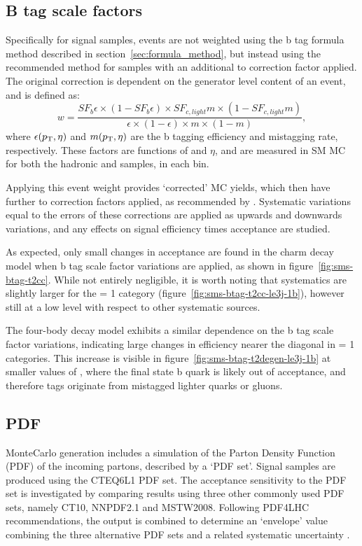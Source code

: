 \subsection{B tag scale factors}
Specifically for \FASTSIM signal samples, events are not weighted using the 
b tag formula method described in section~\ref{sec:formula_method}, but instead
using the 
recommended method for \FULLSIM samples with an additional \FULLSIM to \FASTSIM 
correction factor applied. The original correction is dependent on the generator
level content of an event, and is defined as:
% 
\begin{equation}
w = \frac{SF_b \epsilon \times (1-SF_b \epsilon) \times SF_{c,light} m \times (1
-SF_{c,light} m)}{\epsilon \times (1-\epsilon) \times m \times (1-m)} ,
\label{eq:btag_fullsim_weight}
\end{equation}
% 
where $\epsilon({p_{\text T}}, \eta)$ and $m({p_{\text T}}, \eta)$ are the b tagging efficiency and 
mistagging rate, respectively. These factors are functions of \Pt and $\eta$, and
are measured in SM MC for both the hadronic and \mj samples, in each \HT bin.

Applying this event weight provides `corrected' MC yields, which then 
have further \FASTSIM to \FULLSIM correction factors applied, as recommended by
\cite{btagpogtwiki}.
Systematic variations equal to the errors of these corrections are applied as 
upwards and downwards variations, and any effects on signal efficiency times 
acceptance are studied.

As expected, only small changes in acceptance are found in the charm decay 
model when b tag scale factor variations are applied, as shown in
figure~\ref{fig:sms-btag-t2cc}. While not entirely negligible, it is worth 
noting that systematics are slightly larger for the \nb= 1 category
(figure~\ref{fig:sms-btag-t2cc-le3j-1b}), however still at a low level with 
respect to other systematic sources.

The four-body decay model exhibits a similar dependence on the b tag scale
factor variations, indicating large changes in efficiency nearer the diagonal in
\nb = 1 categories. This increase is visible in
figure~\ref{fig:sms-btag-t2degen-le3j-1b} at smaller values of \deltam, where
the final state b quark is likely out of acceptance, and therefore tags
originate from mistagged lighter quarks or gluons.


\subsection{PDF}
MonteCarlo generation includes a simulation of the Parton Density Function (PDF)
of the incoming partons, described by a `PDF set'. Signal samples are produced
using the \textsc{CTEQ6L1} PDF set. The acceptance 
sensitivity to the PDF set is investigated by comparing results using three
other commonly used PDF sets, namely \textsc{CT10}, \textsc{NNPDF2.1} and
\textsc{MSTW2008}. Following PDF4LHC recommendations, the output is 
combined to determine an `envelope' value combining the three alternative PDF 
sets and a related systematic uncertainty \cite{pdf4lhc}.

